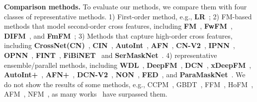 \documentclass[sigconf]{acmart}
\begin{document}
\textbf{Comparison methods.}
To evaluate our methods, we compare them with four classes of representative methods. 
1) First-order method, e.g., \textbf{LR}~\cite{richardson2007predicting};
2) FM-based methods that model second-order cross features, including \textbf{FM}~\cite{rendle2012factorization}, 
\textbf{FwFM}~\cite{pan2018field}, 
\textbf{DIFM}~\cite{lu2020dual}, and
\textbf{FmFM}~\cite{sun2021fm2};
3) Methods that capture high-order cross features, including 
\textbf{CrossNet(CN)}~\cite{wang2017deep}, 
\textbf{CIN}~\cite{lian2018xdeepfm},
\textbf{AutoInt}~\cite{song2019autoint}, 
\textbf{AFN}~\cite{cheng2020adaptive}, 
\textbf{CN-V2}~\cite{wang2021dcnm},
\textbf{IPNN}~\cite{qu2018product}, 
\textbf{OPNN}~\cite{qu2018product},
\textbf{FINT}~\cite{zhao2021fint}, 
\textbf{FiBiNET}~\cite{huang2019fibinet} and 
\textbf{SerMaskNet}~\cite{wang2021masknet}.  
4) representative ensemble/parallel methods, including 
\textbf{WDL}~\cite{cheng2016wide}, 
\textbf{DeepFM}~\cite{guo2017deepfm}, 
\textbf{DCN}~\cite{wang2017deep}, 
\textbf{xDeepFM}~\cite{lian2018xdeepfm}, 
\textbf{AutoInt+}~\cite{song2019autoint}, 
\textbf{AFN+}~\cite{cheng2020adaptive}, 
\textbf{DCN-V2}~\cite{wang2021dcnm},
\textbf{NON}~\cite{luo2020network},
\textbf{FED}~\cite{zhao2020fed}, 
and \textbf{ParaMaskNet}~\cite{wang2021masknet}. 
We do not show the results of some methods, e.g., CCPM~\cite{gehring2017convolutional}, GBDT~\cite{chen2016xgboost}, FFM~\cite{juan2016field}, HoFM~\cite{blondel2016higher}, AFM~\cite{xiao2017attentional}, NFM~\cite{he2017neural}, as many works~\cite{cheng2020adaptive, wang2021dcnm, wang2021masknet} have surpassed them.
\end{document}
